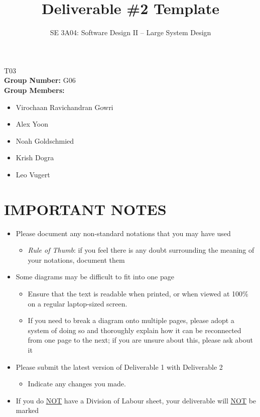 \documentclass[]{article}
\title{Deliverable \#2 Template}
\author{SE 3A04: Software Design II -- Large System Design}
\date{}
\begin{document}
\maketitle
{} T03\\
{\bf Group Number:} G06 \\
{\bf Group Members:}
\begin{itemize}
	\item Virochaan Ravichandran Gowri
	\item Alex Yoon
	\item Noah Goldschmied
	\item Krish Dogra
	\item Leo Vugert
\end{itemize}

\section*{IMPORTANT NOTES}
\begin{itemize}
	\item Please document any non-standard notations that you may have used
	      \begin{itemize}
		      \item \emph{Rule of Thumb}: if you feel there is any doubt surrounding the meaning of your notations, document them
	      \end{itemize}
	\item Some diagrams may be difficult to fit into one page
	      \begin{itemize}
		      \item Ensure that the text is readable when printed, or when viewed at 100\% on a regular laptop-sized screen.
		      \item If you need to break a diagram onto multiple pages, please adopt a system of doing so and thoroughly explain how it can be reconnected from one page to the next; if you are unsure about this, please ask about it
	      \end{itemize}
	\item Please submit the latest version of Deliverable 1 with Deliverable 2
	      \begin{itemize}
		      \item Indicate any changes you made.
	      \end{itemize}
	\item If you do \underline{NOT} have a Division of Labour sheet, your deliverable will \underline{NOT} be marked
\end{itemize}
\end{document}
